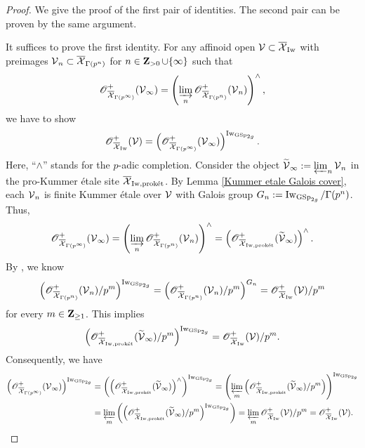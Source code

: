 \begin{proof}
We give the proof of the first pair of identities. The second pair can be proven by the same argument.

It suffices to prove the first identity. For any affinoid open $\calV\subset \overline{\calX}_{\Iw}$ with preimages $\calV_{n}\subset \overline{\calX}_{\Gamma(p^{n})}$ for $n\in \Z_{>0}\cup \{\infty\}$ such that \[
    \scrO_{\overline{\calX}_{\Gamma(p^{\infty})}}^+(\calV_{\infty}) = \left(\varinjlim_{n}\scrO_{\overline{\calX}_{\Gamma(p^n)}}^+(\calV_n)\right)^{\wedge},
\] we have to show $$\scrO_{\overline{\calX}_{\Iw}}^+(\calV)=\left(\scrO_{\overline{\calX}_{\Gamma(p^{\infty})}}^+(\calV_{\infty})\right)^{\Iw_{\GSp_{2g}}}.$$ Here,
{``$\wedge$''} stands for the $p$-adic completion.
Consider the object $\widetilde{\calV}_{\infty}:=\varprojlim_{n}\calV_n$ in the pro-Kummer \'etale site $\overline{\calX}_{\Iw, \proket}$. By Lemma \ref{Kummer etale Galois cover}, each $\calV_n$ is finite Kummer \'{e}tale over $\calV$ with Galois group $G_n:=\Iw_{\GSp_{2g}}/\Gamma(p^n)$. Thus, $$\scrO_{\overline{\calX}_{\Gamma(p^{\infty})}}^+(\calV_{\infty})=\left(\varinjlim_{n}\scrO_{\overline{\calX}_{\Gamma(p^n)}}^+(\calV_n)\right)^{\wedge}=\left(\scrO_{\overline{\calX}_{\Iw, \proket}}^{+}(\widetilde{\calV}_{\infty})\right)^{\wedge}.$$ By \cite[Lemma 4.1.7 \& Corollary 4.4.13]{Diao}, we know $$\left(\scrO_{\overline{\calX}_{\Gamma(p^n)}}^+(\calV_n)/p^m\right)^{\Iw_{\GSp_{2g}}}=\left(\scrO_{\overline{\calX}_{\Gamma(p^n)}}^+(\calV_n)/p^m\right)^{G_n}=\scrO_{\overline{\calX}_{\Iw}}^+(\calV)/p^m$$ for every $m\in \Z_{\geq 1}$. This implies $$\left(\scrO_{\overline{\calX}_{\Iw, \proket}}^+(\widetilde{\calV}_{\infty})/p^m\right)^{\Iw_{\GSp_{2g}}}=\scrO_{\overline{\calX}_{\Iw}}^+(\calV)/p^m.$$ Consequently, we have \begin{align*}
    \left(\scrO_{\overline{\calX}_{\Gamma(p^{\infty})}}^+(\calV_{\infty})\right)^{\Iw_{\GSp_{2g}}} & = \left(\left(\scrO_{\overline{\calX}_{\Iw, \proket}}^{+}(\widetilde{\calV}_{\infty})\right)^{\wedge}\right)^{\Iw_{\GSp_{2g}}}
    = \left(\varprojlim_{m}\left(\scrO_{\overline{\calX}_{\Iw, \proket}}^{+}(\widetilde{\calV}_{\infty})/p^m\right)\right)^{\Iw_{\GSp_{2g}}}\\
    & = \varprojlim_{m}\left(\left(\scrO_{\overline{\calX}_{\Iw, \proket}}^{+}(\widetilde{\calV}_{\infty})/p^m\right)^{\Iw_{\GSp_{2g}}}\right)
    = \varprojlim_{m} \scrO_{\overline{\calX}_{\Iw}}^+(\calV)/p^m
    = \scrO_{\overline{\calX}_{\Iw}}^+(\calV).
\end{align*}
\end{proof}

